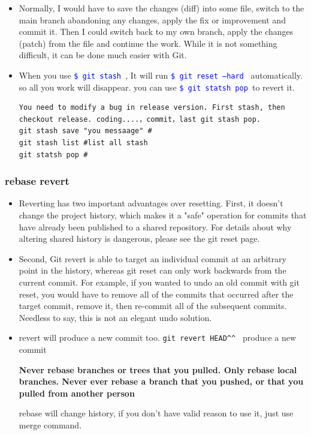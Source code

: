 \documentclass[a4paper,12pt,twoside]{book}
\newcommand{\linuxcommand}[1]{\texttt{\textcolor{blue}{\$ #1 \Pisymbol{psy}{191}}}}
\begin{document}
\begin{itemize}
\begin{itemize}
\begin{itemize}
\item Normally, I would have to save the changes (diff) into some file, switch to the main branch abandoning any changes, apply the fix or improvement and commit it. Then I could switch back to my own branch, apply the changes (patch) from the file and continue the work. While it is not something difficult, it can be done much easier with Git.

\item When you use \linuxcommand{git stash}, It will run \linuxcommand{git reset --hard} automatically. so all you work will disappear. you can use \linuxcommand{git statsh pop }to revert it.

\begin{verbatim}
You need to modify a bug in release version. First stash, then checkout release. coding....，commit，last git stash pop.
git stash save "you messaage" #
git stash list #list all stash
git statsh pop #
\end{verbatim}

\end{itemize}

\subsubsection{rebase revert}
\begin{itemize}

\item Reverting has two important advantages over resetting. First, it doesn't change the project history, which makes it a "safe" operation for commits that have already been published to a shared repository. For details about why altering shared history is dangerous, please see the git reset page.

\item Second, Git revert is able to target an individual commit at an arbitrary point in the history, whereas git reset can only work backwards from the current commit. For example, if you wanted to undo an old commit with git reset, you would have to remove all of the commits that occurred after the target commit, remove it, then re-commit all of the subsequent commits. Needless to say, this is not an elegant undo solution.

\item revert will produce a new commit too. \verb=git revert HEAD^^ = produce a new commit

\textbf{Never rebase branches or trees that you pulled. Only rebase local branches.
Never ever rebase a branch that you pushed, or that you pulled from another person}
\par rebase will change history, if you don't have valid reason to use it, just use merge
command.


\end{itemize}
\end{itemize}
\end{itemize}
\end{document}
